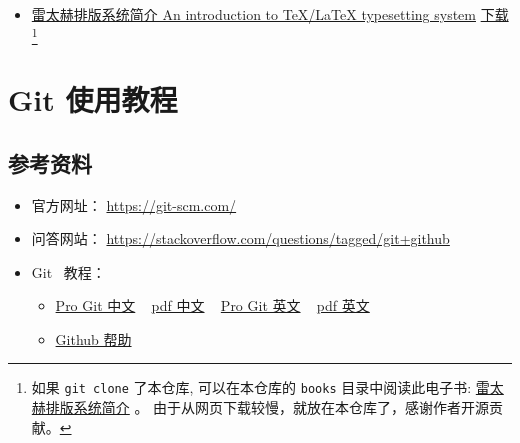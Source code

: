 \documentclass[
    11pt,
    cite=authoryear,
    device=normal,
    lang=cn,
    mode=simple,
    result=answer,
    toc=onecol,
]{elegantbook_sierxue}
\begin{document}
\begin{itemize}
\begin{itemize}
{                可以在本仓库的 \lstinline{books}
                目录中阅读此电子书:
                \href{books/short-math-guide(cn).pdf}
                {一份简短的 LaTeX 数学指南} 。
                由于从网页下载较慢，就放在本仓库了，感谢作者开源贡献。}
                \href{http://mirrors.ustc.edu.cn/CTAN/info/short-math-guide/short-math-guide.pdf}{英文下载}
                \footnote{如果 \lstinline{git clone} 了本仓库,
                可以在本仓库的 \lstinline{books}
                目录中阅读此电子书:
                \href{books/short-math-guide.pdf}
                {Short Math Guide for \LaTeX{}} 。
                由于从网页下载较慢，就放在本仓库了，感谢作者开源贡献。}
            \item \href{https://github.com/huangxg/lnotes}
                {雷太赫排版系统简介 An introduction to TeX/LaTeX
                typesetting system}
        \href{https://github.com/huangxg/lnotes/raw/master/lnotes2.pdf}{下载}
                \footnote{如果 \lstinline{git clone} 了本仓库,
                可以在本仓库的 \lstinline{books}
                目录中阅读此电子书:
                \href{books/lnotes2.pdf}{雷太赫排版系统简介} 。
                由于从网页下载较慢，就放在本仓库了，感谢作者开源贡献。}
        \end{itemize}
\end{itemize}



\chapter{Git 使用教程}%
\label{cha:git-tips}

\section{参考资料}%
\label{sec:git-refs}

\begin{itemize}
    \item 官方网址： \href{https://git-scm.com/}{https://git-scm.com/}
    \item 问答网站：
        \href{https://stackoverflow.com/questions/tagged/git+github}
        {https://stackoverflow.com/questions/tagged/git+github}
    \item Git~ 教程：
        \begin{itemize}
            \item \href{https://git-scm.com/book/zh/v2}
                {Pro Git 中文}
                ~ \href{books/progit_v2.1.31_zh.pdf}{pdf 中文}
                ~ \href{https://git-scm.com/book/en/v2} {Pro Git 英文}
                 ~ \href{books/progit_v2.1.177_en.pdf}{pdf 英文}
            \item \href{https://help.github.com/en/github}
                {Github 帮助}
        \end{itemize}
\end{itemize}
\end{document}
